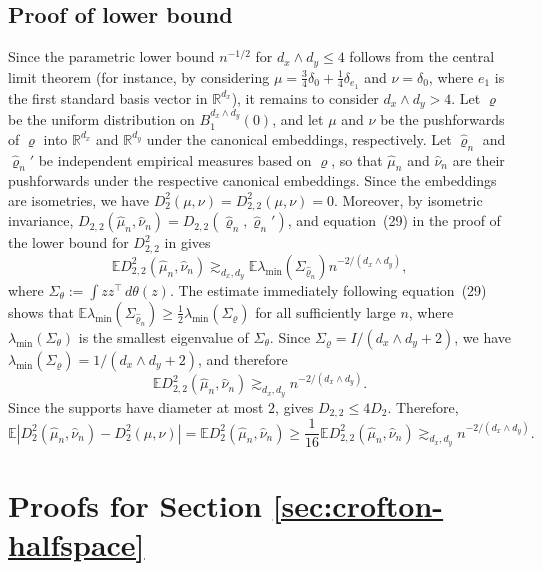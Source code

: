 \documentclass[11pt]{amsart}
\theoremstyle{definition}
\theoremstyle{remark}
\newcommand{\R}{\mathbb{R}}
\newcommand{\E}{\mathbb{E}}
\newcommand{\1}{\mathbf{1}}
\numberwithin{equation}{section}
\begin{document}
\subsection{Proof of lower bound}
Since the parametric lower bound $n^{-1/2}$ for
$d_x\wedge d_y\leq4$ follows from the central limit theorem (for instance,
by considering $\mu=\frac34\delta_0+\frac14\delta_{e_1}$ and
$\nu=\delta_0$, where $e_1$ is the first standard basis vector in
$\R^{d_x}$), it remains
to consider $d_x\wedge d_y>4$. Let $\varrho$ be the uniform distribution
on $B_1^{d_x\wedge d_y}(0)$, and let $\mu$ and $\nu$ be the pushforwards
of $\varrho$ into $\R^{d_x}$ and $\R^{d_y}$ under the canonical embeddings,
respectively. Let $\widehat\varrho_n$ and $\widehat\varrho_n'$ be independent
empirical measures based on $\varrho$, so that $\widehat\mu_n$ and
$\widehat\nu_n$ are their pushforwards under the respective canonical
embeddings. Since the embeddings are isometries, we have
$D_2^2(\mu,\nu)=D_{2,2}^2(\mu,\nu)=0$. Moreover, by isometric invariance,
$D_{2,2}(\widehat\mu_n,\widehat\nu_n)
=D_{2,2}(\widehat\varrho_n,\widehat\varrho_n')$, and equation~(29) in the
proof of the lower bound for $D_{2,2}^2$ in
\cite[Section~5.3.2]{zhang2024gromov} gives
\begin{equation*}
\E D_{2,2}^2(\widehat\mu_n,\widehat\nu_n)
\gtrsim_{d_x,d_y}
\E\lambda_{\min}(\Sigma_{\widehat\varrho_n})
n^{-2/(d_x\wedge d_y)},
\end{equation*}
where $\Sigma_\theta:=\int zz^\top\,d\theta(z)$. The
estimate immediately following equation~(29) shows that
$\E\lambda_{\min}(\Sigma_{\widehat\varrho_n})\geq
\frac12\lambda_{\min}(\Sigma_\varrho)$ for all sufficiently large $n$, where $\lambda_{\min}(\Sigma_\theta)$ is the smallest eigenvalue of $\Sigma_\theta$.
Since $\Sigma_\varrho=I/(d_x\wedge d_y+2)$, we have
$\lambda_{\min}(\Sigma_\varrho)=1/(d_x\wedge d_y+2)$, and therefore
\begin{equation*}
\E D_{2,2}^2(\widehat\mu_n,\widehat\nu_n)
\gtrsim_{d_x,d_y}
n^{-2/(d_x\wedge d_y)}.
\end{equation*}
Since the supports have diameter at most $2$,
\cite[Lemma~9.5(iii)]{sturm2023space} gives
$D_{2,2}\leq4D_2$. Therefore,
\[
\E\left|
D_2^2(\widehat\mu_n,\widehat\nu_n)-D_2^2(\mu,\nu)
\right| =
\E D_2^2(\widehat\mu_n,\widehat\nu_n) \geq
\frac1{16}\E D_{2,2}^2(\widehat\mu_n,\widehat\nu_n) \gtrsim_{d_x,d_y}
n^{-2/(d_x\wedge d_y)}.
\]



\clearpage
\appendix
\section{Proofs for Section \ref{sec:crofton-halfspace}}\label{sec:crofton-identities}
\end{document}
